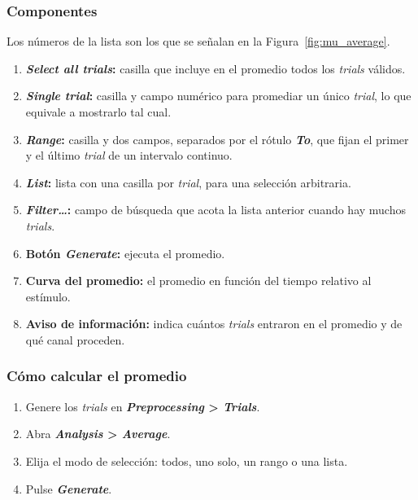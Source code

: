 \documentclass[11pt,a4paper]{article}
\begin{document}
    \subsubsection*{Componentes}
    Los n\'umeros de la lista son los que se se\~nalan en la Figura~\ref{fig:mu_average}.
    \begin{enumerate}[label=(\arabic*)]
        \item \textbf{\textit{Select all trials}:} casilla que incluye en el promedio todos los \textit{trials} v\'alidos.
        \item \textbf{\textit{Single trial}:} casilla y campo num\'erico para promediar un \'unico \textit{trial}, lo que equivale a mostrarlo tal cual.
        \item \textbf{\textit{Range}:} casilla y dos campos, separados por el r\'otulo \textbf{\textit{To}}, que fijan el primer y el \'ultimo \textit{trial} de un intervalo continuo.
        \item \textbf{\textit{List}:} lista con una casilla por \textit{trial}, para una selecci\'on arbitraria.
        \item \textbf{\textit{Filter\ldots}:} campo de b\'usqueda que acota la lista anterior cuando hay muchos \textit{trials}.
        \item \textbf{Bot\'on \textit{Generate}:} ejecuta el promedio.
        \item \textbf{Curva del promedio:} el promedio en funci\'on del tiempo relativo al est\'imulo.
        \item \textbf{Aviso de informaci\'on:} indica cu\'antos \textit{trials} entraron en el promedio y de qu\'e canal proceden.
    \end{enumerate}

    \subsubsection*{C\'omo calcular el promedio}
    \begin{enumerate}
        \item Genere los \textit{trials} en \textbf{\textit{Preprocessing} > \textit{Trials}}.
        \item Abra \textbf{\textit{Analysis} > \textit{Average}}.
        \item Elija el modo de selecci\'on: todos, uno solo, un rango o una lista.
        \item Pulse \textbf{\textit{Generate}}.
    \end{enumerate}
\end{document}

